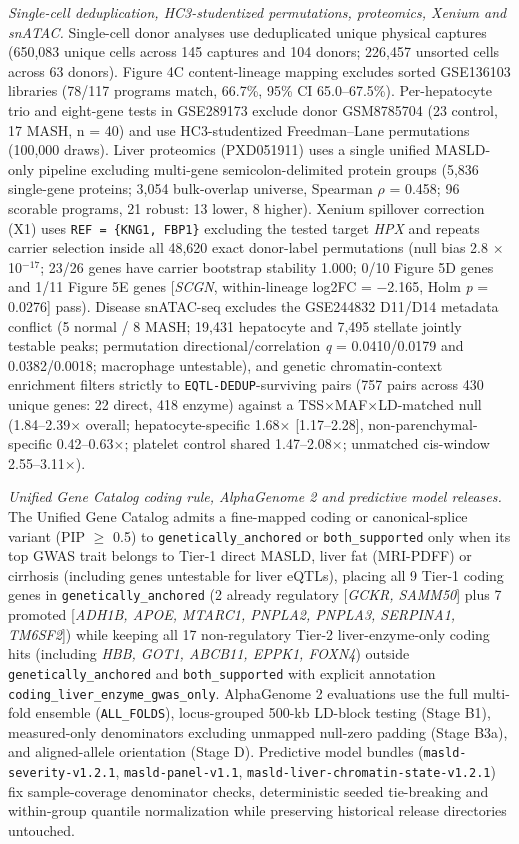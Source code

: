 \emph{Single-cell deduplication, HC3-studentized permutations, proteomics, Xenium and snATAC.} Single-cell donor analyses use deduplicated unique physical captures (650,083 unique cells across 145 captures and 104 donors; 226,457 unsorted cells across 63 donors). Figure 4C content-lineage mapping excludes sorted GSE136103 libraries (78/117 programs match, 66.7\%, 95\% CI 65.0--67.5\%). Per-hepatocyte trio and eight-gene tests in GSE289173 exclude donor GSM8785704 (23 control, 17 MASH, n = 40) and use HC3-studentized Freedman--Lane permutations (100,000 draws). Liver proteomics (PXD051911) uses a single unified MASLD-only pipeline excluding multi-gene semicolon-delimited protein groups (5,836 single-gene proteins; 3,054 bulk-overlap universe, Spearman $\rho$ = 0.458; 96 scorable programs, 21 robust: 13 lower, 8 higher). Xenium spillover correction (X1) uses \texttt{REF = \{KNG1, FBP1\}} excluding the tested target \emph{HPX} and repeats carrier selection inside all 48,620 exact donor-label permutations (null bias 2.8 $\times$ 10$^{-17}$; 23/26 genes have carrier bootstrap stability 1.000; 0/10 Figure 5D genes and 1/11 Figure 5E genes [\emph{SCGN}, within-lineage log2FC = $-$2.165, Holm \emph{p} = 0.0276] pass). Disease snATAC-seq excludes the GSE244832 D11/D14 metadata conflict (5 normal / 8 MASH; 19,431 hepatocyte and 7,495 stellate jointly testable peaks; permutation directional/correlation \emph{q} = 0.0410/0.0179 and 0.0382/0.0018; macrophage untestable), and genetic chromatin-context enrichment filters strictly to \texttt{EQTL-DEDUP}-surviving pairs (757 pairs across 430 unique genes: 22 direct, 418 enzyme) against a TSS$\times$MAF$\times$LD-matched null (1.84--2.39$\times$ overall; hepatocyte-specific 1.68$\times$ [1.17--2.28], non-parenchymal-specific 0.42--0.63$\times$; platelet control shared 1.47--2.08$\times$; unmatched cis-window 2.55--3.11$\times$).

\emph{Unified Gene Catalog coding rule, AlphaGenome 2 and predictive model releases.} The Unified Gene Catalog admits a fine-mapped coding or canonical-splice variant (PIP $\ge$ 0.5) to \texttt{genetically\_anchored} or \texttt{both\_supported} only when its top GWAS trait belongs to Tier-1 direct MASLD, liver fat (MRI-PDFF) or cirrhosis (including genes untestable for liver eQTLs), placing all 9 Tier-1 coding genes in \texttt{genetically\_anchored} (2 already regulatory [\emph{GCKR, SAMM50}] plus 7 promoted [\emph{ADH1B, APOE, MTARC1, PNPLA2, PNPLA3, SERPINA1, TM6SF2}]) while keeping all 17 non-regulatory Tier-2 liver-enzyme-only coding hits (including \emph{HBB, GOT1, ABCB11, EPPK1, FOXN4}) outside \texttt{genetically\_anchored} and \texttt{both\_supported} with explicit annotation \texttt{coding\_liver\_enzyme\_gwas\_only}. AlphaGenome 2 evaluations use the full multi-fold ensemble (\texttt{ALL\_FOLDS}), locus-grouped 500-kb LD-block testing (Stage B1), measured-only denominators excluding unmapped null-zero padding (Stage B3a), and aligned-allele orientation (Stage D). Predictive model bundles (\texttt{masld-severity-v1.2.1}, \texttt{masld-panel-v1.1}, \texttt{masld-liver-chromatin-state-v1.2.1}) fix sample-coverage denominator checks, deterministic seeded tie-breaking and within-group quantile normalization while preserving historical release directories untouched.

